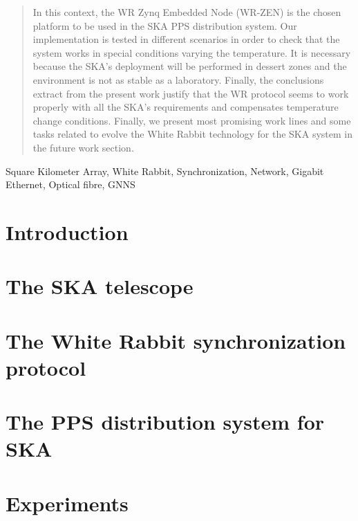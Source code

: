 \documentclass[review]{elsarticle}
\begin{document}
\begin{frontmatter}
\begin{abstract}
    In this context, 
	the WR Zynq Embedded Node (WR-ZEN) is the chosen platform to be used in the 
	SKA PPS distribution system. Our implementation is tested in different 
	scenarios in order to check that the system works in special conditions 
	varying the temperature. It is necessary because the SKA's deployment will 
	be performed in dessert zones and the environment is not as stable as a 
	laboratory. Finally, the conclusions extract from the present work justify 
	that the WR protocol seems to work properly with all the SKA's requirements 
	and compensates temperature change conditions. Finally, we present most 
	promising work lines and some tasks related to evolve the White Rabbit 
	technology for the SKA system in the future work section.
\end{abstract}

\begin{keyword}
	Square Kilometer Array, White Rabbit, Synchronization, Network, Gigabit Ethernet, Optical fibre, GNNS
\end{keyword}

\end{frontmatter}

\linenumbers

\section{Introduction}



\section{The SKA telescope} \label{sec:ska}



\section{The White Rabbit synchronization protocol}



\section{The PPS distribution system for SKA}



\section{Experiments}
\end{document}
